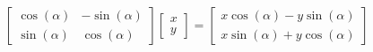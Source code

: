 \documentclass{article}
\begin{document}
\thispagestyle{empty}


$$
\begin{bmatrix}\cos(\alpha)&-\sin(\alpha)\\\sin(\alpha)&\cos(\alpha)\end{bmatrix}
\begin{bmatrix}x\\y\end{bmatrix} = \begin{bmatrix}x\cos(\alpha)-y\sin(\alpha)\\x\sin(\alpha)+y\cos(\alpha)\end{bmatrix}
$$
\end{document}
